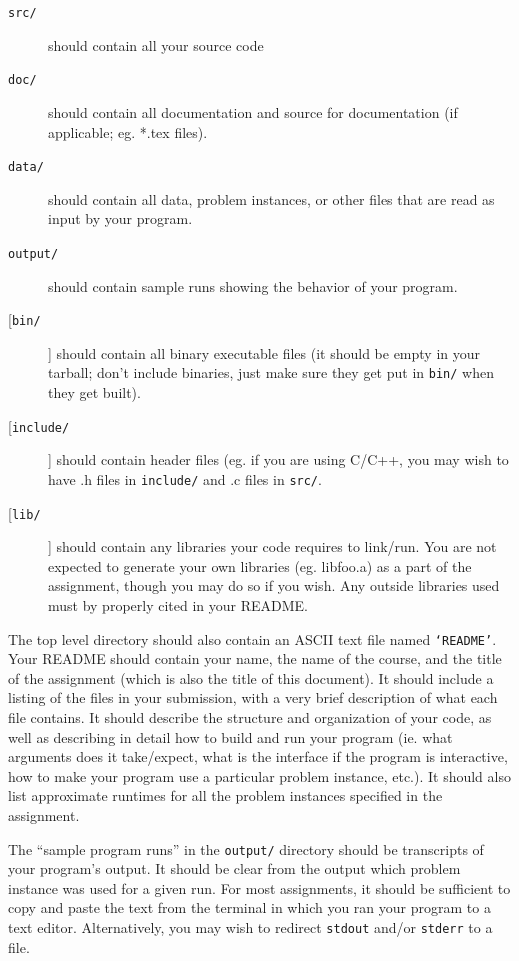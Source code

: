 \documentclass[12pt]{article}
\newcommand{\ttt}[1]{\texttt{#1}}
\begin{document}
\begin{description}
  \item[\large \ttt{src/}] should contain all your source code
  \item[\large \ttt{doc/}] should contain all documentation and source for
    documentation (if applicable; eg. *.tex files).
  \item[\large \ttt{data/}] should contain all data, problem instances, or
    other files that are read as input by your program.
  \item[\large \ttt{output/}] should contain sample runs showing the behavior
    of your program.
  \item[\large [\ttt{bin/}]] should contain all binary
    executable files (it should be empty in your tarball; don't include
    binaries, just make sure they get put in \ttt{bin/} when they get built).
  \item[\large [\ttt{include/}]] should contain header files (eg. if you are
    using C/C++, you may wish to have .h files in \ttt{include/} and .c files in \ttt{src/}.
  \item[\large [\ttt{lib/}]] should contain any libraries your code requires
    to link/run.  You are not expected to generate your own libraries (eg.
    libfoo.a) as a part of the assignment, though you may do so if you wish.
    Any outside libraries used must by properly cited in your README.
\end{description}

The top level directory should also contain an ASCII text file named
\ttt{`README'}.  Your README should contain your name, the name of the
course, and the title of the assignment (which is also the title of this
document).  It should include a listing of the files in your submission, with a
very brief description of what each file contains.  It should describe the
structure and organization of your code, as well as describing in detail how to
build and run your program (ie. what arguments does it take/expect, what is the
interface if the program is interactive, how to make your program use a
particular problem instance, etc.).  It should also list approximate runtimes
for all the problem instances specified in the assignment.

The ``sample program runs'' in the \ttt{output/} directory should be transcripts
of your program's output.  It should be clear from the output which problem
instance was used for a given run.  For most assignments, it should be
sufficient to copy and paste the text from the terminal in which you ran your
program to a text editor.  Alternatively, you may wish to redirect \ttt{stdout}
and/or \ttt{stderr} to a file.
\end{document}

